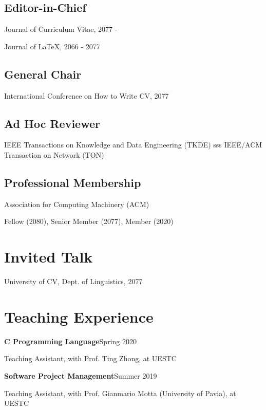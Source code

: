 \documentclass{article}
\newcommand{\cvsubsection}[1]{\subsection*{\hspace{1.45em}#1}}
\begin{document}
\cvsubsection{Editor-in-Chief}
\indent

Journal of Curriculum Vitae, 2077 -

Journal of \LaTeX, 2066 - 2077

\cvsubsection{General Chair}
\indent

International Conference on How to Write CV, 2077

\cvsubsection{Ad Hoc Reviewer}
\indent

IEEE Transactions on Knowledge and Data Engineering (TKDE)
sss
IEEE/ACM Transaction on Network (TON)

\cvsubsection{Professional Membership}
\indent

Association for Computing Machinery (ACM)

\hspace{2em}Fellow (2080), Senior Member (2077), Member (2020)









\section*{Invited Talk}
\indent 

University of CV, Dept. of Linguistics, 2077 



\section*{Teaching Experience}
\indent

\textbf{C Programming Language}\hfill Spring 2020

\hspace{2em}Teaching Assistant, with Prof. Ting Zhong, at UESTC

\textbf{Software Project Management}\hfill Summer 2019

\hspace{2em}Teaching Assistant, with Prof. Gianmario Motta (University of Pavia), at UESTC





\end{document}
